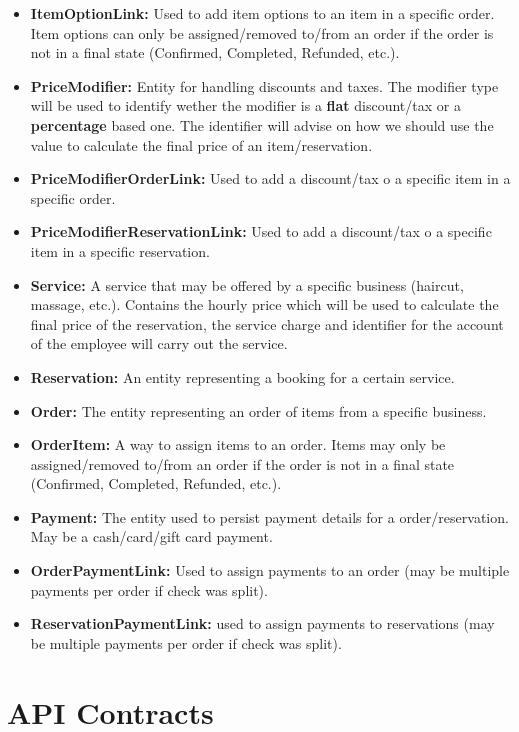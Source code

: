 \documentclass[11pt,a4paper,pdftex]{article}
\begin{document}
\begin{itemize}
    \item \textbf{ItemOptionLink:} Used to add item options to an item in a specific order. Item options can only be assigned/removed to/from an order if the order is not in a final state (Confirmed, Completed, Refunded, etc.).
    \item \textbf{PriceModifier:} Entity for handling discounts and taxes. The modifier type will be used to identify wether the modifier is a \textbf{flat} discount/tax or a \textbf{percentage} based one. The identifier will advise on how we should use the value to calculate the final price of an item/reservation.
    \item \textbf{PriceModifierOrderLink:} Used to add a discount/tax o a specific item in a specific order.
    \item \textbf{PriceModifierReservationLink:} Used to add a discount/tax o a specific item in a specific reservation.
    \item \textbf{Service:} A service that may be offered by a specific business (haircut, massage, etc.). Contains the hourly price which will be used to calculate the final price of the reservation, the service charge and identifier for the account of the employee will carry out the service.
    \item \textbf{Reservation:} An entity representing a booking for a certain service.
    \item \textbf{Order:} The entity representing an order of items from a specific business.
    \item \textbf{OrderItem:} A way to assign items to an order. Items may only be assigned/removed to/from an order if the order is not in a final state (Confirmed, Completed, Refunded, etc.).
    \item \textbf{Payment:} The entity used to persist payment details for a order/reservation. May be a cash/card/gift card payment.
    \item \textbf{OrderPaymentLink:} Used to assign payments to an order (may be multiple payments per order if check was split).
    \item \textbf{ReservationPaymentLink:} used to assign payments to reservations (may be multiple payments per order if check was split).
\end{itemize}

\section{API Contracts}
\end{document}
